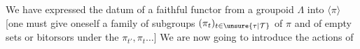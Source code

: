 We have expressed the datum of a faithful functor from a groupoid $\Lambda$ into $\langle\pi\rangle$  [one must give oneself a family of subgroups $(\pi_t)_{t\in\unsure{\tau|\mathcal T}}$ of $\pi$ and of empty sets or bitorsors under the $\pi_{t'},\pi_t\ldots$] We are now going to introduce the actions of
